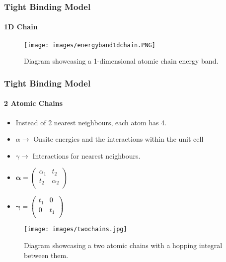 \documentclass{beamer}
\begin{document}
	\begin{frame}
		\frametitle{Tight Binding Model}
		\framesubtitle{1D Chain}
		
		\begin{figure}[h]
			\begin{center}
				\texttt{[image: images/energyband1dchain.PNG]}
			\end{center}
			\caption{Diagram showcasing a 1-dimensional atomic chain energy band.} 
			\label{fig:1dchainenergyband}
		\end{figure}
	
	\end{frame}

	\begin{frame}
		\frametitle{Tight Binding Model}
		\framesubtitle{2 Atomic Chains}
		
		\begin{itemize}
			\item Instead of 2 nearest neighbours, each atom has 4. 
			\item $\alpha \rightarrow$ Onsite energies and the interactions within the unit cell 
			\item $\gamma \rightarrow$ Interactions for nearest neighbours. 
			\item $        \mathbf{\alpha} = \begin{pmatrix}
			\alpha_1 & t_2  \\
			t_2 & \alpha_2 \\
			\end{pmatrix}
			$
			
			\item $        \mathbf{\gamma} = \begin{pmatrix}
			t_1 & 0  \\
			0 & t_1 \\
			\end{pmatrix}
			$
			
		\end{itemize}
		\begin{figure}[h]
			\begin{center}
				\texttt{[image: images/twochains.jpg]}
			\end{center}
			\caption{Diagram showcasing a two atomic chains with a hopping integral between them.} 
			\label{fig:1dchainenergyband}
		\end{figure}
	
		
		
	\end{frame}
\end{document}

